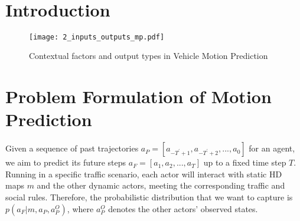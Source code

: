 

\

\section{Introduction}
\label{sec:2_introduction}

\begin{figure}[h]
	\centering
	\texttt{[image: 2\_inputs\_outputs\_mp.pdf]}
	\caption{Contextual factors and output types in Vehicle Motion Prediction}
	\label{fig:2_input_output_map}
\end{figure}



\section{Problem Formulation of Motion Prediction}
\label{sec:2_problem_formulation_mp}

Given a sequence of past trajectories $a_{P}=[a_{-T^{'}+1},a_{-T^{'}+2},...,a_{0}]$ for an agent, we aim to predict its future steps $a_{F}=[a_{1},a_{2},...,a_{T}]$ up to a fixed time step $T$. Running in a specific traffic scenario, each actor will interact with static HD maps $m$ and the other dynamic actors, meeting the corresponding traffic and social rules. Therefore, the probabilistic distribution that we want to capture is $p(a_F|m, a_P, a^O_P)$, where $a^O_P$ denotes the other actors' observed states. 




